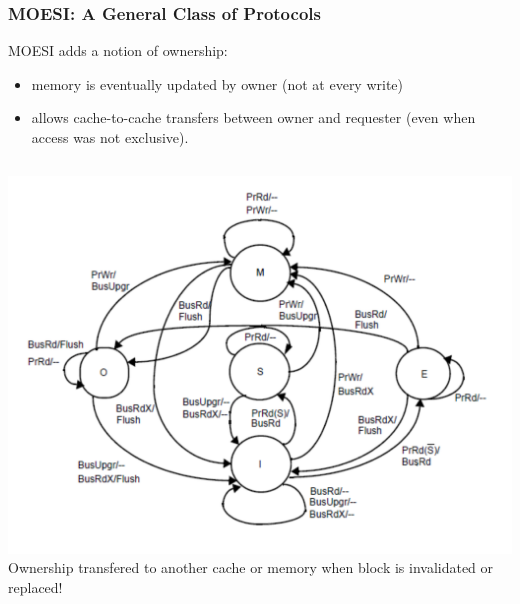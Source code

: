 \documentclass{beamer}
\newcommand{\emp}[1]{\textcolor{DikuRed}{ #1}}
\begin{document}
\begin{frame}[fragile,t]
\frametitle{MOESI: A General Class of Protocols}

MOESI adds a notion of ownership:
\begin{itemize}
    \item memory is eventually updated by owner (not at every write)
    \item allows cache-to-cache transfers between owner and requester
            (even when access was not exclusive).
\end  {itemize}


\begin{columns}\hspace{-5ex}
\includegraphics[width=45ex]{Figures/FigsInfCoherence/MOESI}
\emp{Ownership transfered to another cache or memory when
block is invalidated or replaced!}
\end{columns}

\end{frame}
\end{document}
